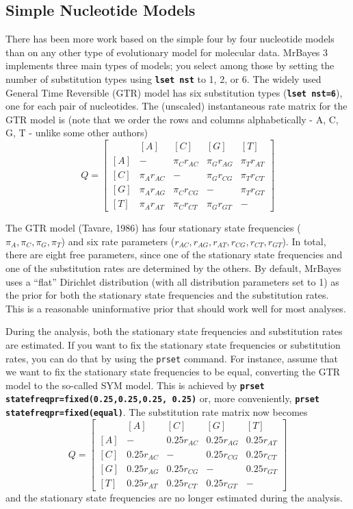\documentclass[12pt]{book}
\newcommand{\ttt}[1]{\texttt{#1}}
\newcommand{\tb}[1]{\ttt{\textbf{#1}}}
\begin{document}
\subsection{Simple Nucleotide Models}
There has been more work based on the simple four by four nucleotide models than on any other type
of evolutionary model for molecular data. MrBayes 3 implements three main types of models; you
select among those by setting the number of substitution types using \tb{lset nst} to 1, 2, or 6.
The widely used General Time Reversible (GTR) model has six substitution types (\tb{lset nst=6}),
one for each pair of nucleotides. The (unscaled) instantaneous rate matrix for the GTR model is
(note that we order the rows and columns alphabetically - A, C, G, T - unlike some other authors)
\[ Q=\begin{bmatrix} & [A] & [C] & [G] & [T] \\ [A]& - & \pi_C r_{AC} & \pi_G r_{AG} & \pi_T
r_{AT}\\ [C]& \pi_A r_{AC} & - & \pi_G r_{CG} &\pi_T r_{CT} \\ [G]& \pi_A r_{AG} & \pi_C r_{CG}& -
& \pi_T r_{GT}\\ [T]& \pi_A r_{AT} & \pi_C r_{CT}&\pi_G r_{GT}  & - \end{bmatrix} \]

The GTR model (Tavare, 1986) has four stationary state frequencies ($\pi_A, \pi_C, \pi_G, \pi_T$)
and six rate parameters ($r_{AC}, r_{AG}, r_{AT}, r_{CG}, r_{CT}, r_{GT}$). In total, there are
eight free parameters, since one of the stationary state frequencies and one of the substitution
rates are determined by the others. By default, MrBayes uses a ``flat'' Dirichlet distribution
(with all distribution parameters set to 1) as the prior for both the stationary state frequencies
and the substitution rates. This is a reasonable uninformative prior that should work well for
most analyses.

During the analysis, both the stationary state frequencies and substitution rates are estimated. If
you want to fix the stationary state frequencies or substitution rates, you can do that by using
the \ttt{prset} command. For instance, assume that we want to fix the stationary state frequencies
to be equal, converting the GTR model to the so-called SYM model. This is achieved by \tb{prset
statefreqpr=fixed(0.25,0.25,0.25, 0.25)} or, more conveniently, \tb{prset
statefreqpr=fixed(equal)}. The substitution rate matrix now becomes \[ Q=\begin{bmatrix} & [A] &
    [C] & [G] & [T] \\ [A]& - & 0.25 r_{AC} & 0.25 r_{AG} & 0.25 r_{AT}\\ [C]& 0.25 r_{AC} & - &
0.25 r_{CG} &0.25 r_{CT} \\ [G]& 0.25 r_{AG} & 0.25 r_{CG}& - & 0.25 r_{GT}\\ [T]& 0.25 r_{AT} &
0.25 r_{CT}&0.25 r_{GT}  & - \end{bmatrix} \] and the stationary state frequencies are no longer
estimated during the analysis.
\end{document}
